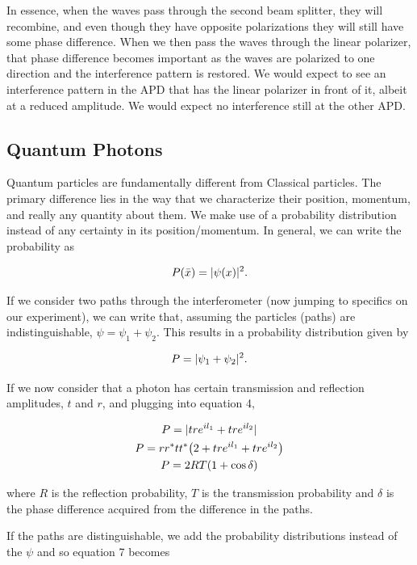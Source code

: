 \documentclass{article}
\DeclarePairedDelimiter\abs{\lvert}{\rvert}%
\DeclarePairedDelimiter{\parens}{\lparen}{\rparen}
\begin{document}
	In essence, when the waves pass through the second beam splitter, they will recombine, and even though they have opposite polarizations they will still have some phase difference.  When we then pass the waves through the linear polarizer, that phase difference becomes important as the waves are polarized to one direction and the interference pattern is restored.  We would expect to see an interference pattern in the APD that has the linear polarizer in front of it, albeit at a reduced amplitude.  We would expect no interference still at the other APD.

	\subsection{Quantum Photons}
	Quantum particles are fundamentally different from Classical particles.  The primary difference lies in the way that we characterize their position, momentum, and really any quantity about them.  We make use of a probability distribution instead of any certainty in its position/momentum.  In general, we can write the probability as

	\begin{equation*}
		P(\bar{x}) = \abs{\psi(x)}^2.
	\end{equation*}

	If we consider two paths through the interferometer (now jumping to specifics on our experiment), we can write that, assuming the particles (paths) are indistinguishable, $\psi = \psi_1 + \psi_2$.  This results in a probability distribution given by

	\begin{equation}
		P = \abs{\psi_1+\psi_2}^2.
	\end{equation}

	If we now consider that a photon has certain transmission and reflection amplitudes, $t$ and $r$, and plugging into equation 4, 

	\begin{gather}
		P = \abs{tre^{il_1} + tre^{il_2}} \\
		P = rr^* tt^* \parens*{2+tre^{il_1} + tre^{il_2}} \\
		P = 2RT\parens*{1+\cos{\delta}}
	\end{gather}

	where $R$ is the reflection probability, $T$ is the transmission probability and $\delta$ is the phase difference acquired from the difference in the paths.

	If the paths are distinguishable, we add the probability distributions instead of the $\psi$ and so equation 7 becomes
\end{document}
